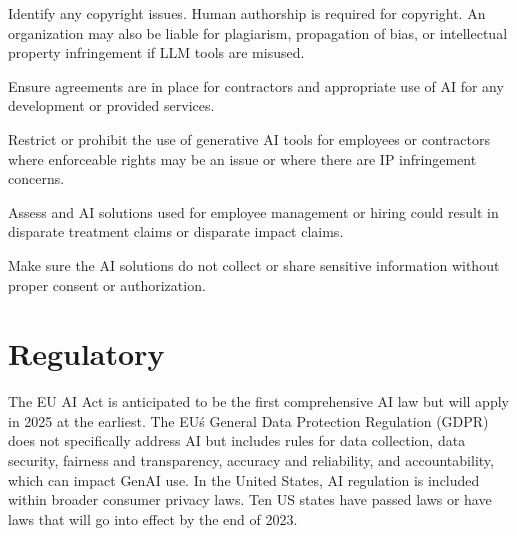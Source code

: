 \begin{minipage}{\linewidth}
\begin{checklist}
  \item Identify any copyright issues. Human authorship is required for copyright. An organization may also be liable for plagiarism, propagation of bias, or intellectual property infringement if LLM tools are misused.
  \item Ensure agreements are in place for contractors and appropriate use of AI for any development or provided services.
  \item Restrict or prohibit the use of generative AI tools for employees or contractors where enforceable rights may be an issue or where there are IP infringement concerns.
  \item Assess and AI solutions used for employee management or hiring could result in disparate treatment claims or disparate impact claims.
  \item Make sure the AI solutions do not collect or share sensitive information without proper consent or authorization.
\end{checklist}
\end{minipage}

\section{Regulatory}
The EU AI Act is anticipated to be the first comprehensive AI law but will
apply in 2025 at the earliest. The EU\'s General Data Protection Regulation
(GDPR) does not specifically address AI but includes rules for data collection,
data security, fairness and transparency, accuracy and reliability, and
accountability, which can impact GenAI use. In the United States, AI regulation
is included within broader consumer privacy laws. Ten US states have passed
laws or have laws that will go into effect by the end of 2023.

